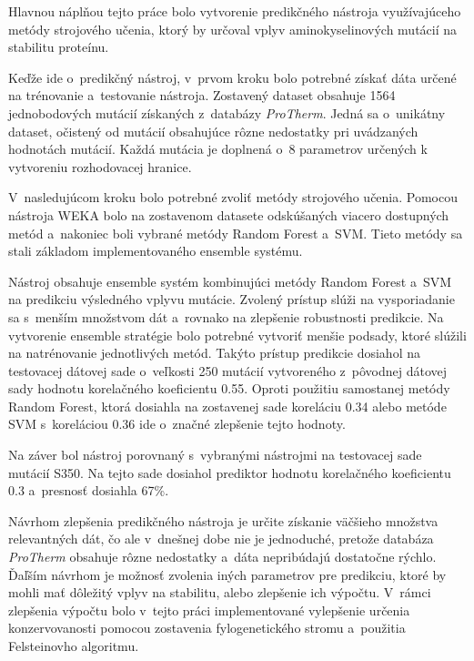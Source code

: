 Hlavnou náplňou tejto práce bolo vytvorenie predikčného nástroja využívajúceho metódy strojového učenia, ktorý by určoval vplyv aminokyselinových mutácií na stabilitu proteínu.

Keďže ide o~predikčný nástroj, v~prvom kroku bolo potrebné získať dáta určené na trénovanie a~testovanie nástroja. Zostavený dataset obsahuje 1564 jednobodových mutácií získaných z~databázy \textit{ProTherm}. Jedná sa o~unikátny dataset, očistený od mutácií obsahujúce rôzne nedostatky pri uvádzaných hodnotách mutácií. Každá mutácia je doplnená o~8 parametrov určených k vytvoreniu rozhodovacej hranice.

V~nasledujúcom kroku bolo potrebné zvoliť metódy strojového učenia. Pomocou nástroja WEKA bolo na zostavenom datasete odskúšaných viacero dostupných metód a~nakoniec boli vybrané metódy Random Forest a~SVM. Tieto metódy sa stali základom implementovaného ensemble systému.

Nástroj obsahuje ensemble systém kombinujúci metódy Random Forest a~SVM na predikciu výsledného vplyvu mutácie. Zvolený prístup slúži na vysporiadanie sa s~menším množstvom dát a~rovnako na zlepšenie robustnosti predikcie. 
Na vytvorenie ensemble stratégie bolo potrebné vytvoriť menšie podsady, ktoré slúžili na natrénovanie jednotlivých metód. Takýto prístup predikcie dosiahol na testovacej dátovej sade o~veľkosti 250 mutácií vytvoreného z~pôvodnej dátovej sady hodnotu korelačného koeficientu 0.55. Oproti použitiu samostanej metódy Random Forest, ktorá dosiahla na zostavenej sade koreláciu 0.34 alebo metóde SVM s~koreláciou 0.36 ide o~značné zlepšenie tejto hodnoty.

Na záver bol nástroj porovnaný s~vybranými nástrojmi na testovacej sade mutácií S350. Na tejto sade dosiahol prediktor hodnotu korelačného koeficientu 0.3 a~presnosť dosiahla 67\%.

Návrhom zlepšenia predikčného nástroja je určite získanie väčšieho množstva relevantných dát, čo ale v~dnešnej dobe nie je jednoduché, pretože databáza \textit{ProTherm} obsahuje rôzne nedostatky a~dáta nepribúdajú dostatočne rýchlo. 
Ďaľším návrhom je možnosť zvolenia iných parametrov pre predikciu, ktoré by mohli mať dôležitý vplyv na stabilitu, alebo zlepšenie ich výpočtu. V~rámci zlepšenia výpočtu bolo v~tejto práci implementované vylepšenie určenia konzervovanosti pomocou zostavenia fylogenetického stromu a~použitia Felsteinovho algoritmu.

